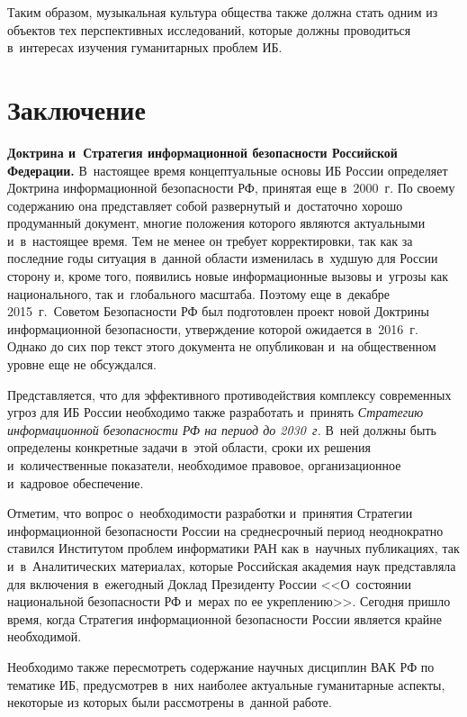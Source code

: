 \begin{multicols}{2}
     Таким образом, музыкальная культура общества также должна стать 
одним из объектов тех перспективных исследований, которые должны 
проводиться в~интересах изучения гуманитарных проблем ИБ.
    
    \section{Заключение}
     
     \textbf{Доктрина и~Стратегия информационной безопасности 
Российской Федерации.} В~настоящее время концептуальные основы 
ИБ России определяет Доктрина 
информационной без\-опас\-ности РФ, принятая еще в~2000~г. По своему 
содержанию она представляет собой развернутый и~достаточно хорошо 
продуманный документ, многие положения которого являются актуальными 
и~в~настоящее время. Тем не менее он требует корректировки, так как за 
последние годы ситуация в~данной области изменилась в~худшую для России 
сторону и, кроме того, появились новые информационные вызовы и~угрозы 
как национального, так и~глобального масштаба. 
     Поэтому еще в~декабре 2015~г.\ Советом Безопасности РФ был 
подготовлен проект новой Доктрины информационной безопасности, 
утверждение которой ожидается в~2016~г. Однако до сих пор текст этого 
документа не опубликован и~на общественном уровне еще не обсуждался.
     
     Представляется, что для эффективного противодействия комплексу 
современных угроз для ИБ России необходимо 
также разработать и~принять \textit{Стратегию информационной 
безопасности РФ на период до 2030~г.} В~ней должны быть определены 
конкретные задачи в~этой области, сроки их решения и~количественные 
показатели, необходимое правовое, организационное и~кадровое 
обеспе\-чение. 
     
     Отметим, что вопрос о~необходимости разработки и~принятия 
Стратегии информационной безопас\-ности России на среднесрочный период 
неоднократно ставился Институтом проблем информатики РАН как 
в~научных публикациях, так и~в~Аналитических материалах, которые 
Российская академия наук представляла для включения в~ежегодный Доклад 
Президенту России <<О~состоянии национальной безопасности РФ и~мерах 
по ее укреплению>>. Сегодня пришло время, когда Стратегия 
информационной безопасности России является крайне необходимой.
     
     Необходимо также пересмотреть содержание научных дисциплин ВАК 
РФ по тематике ИБ, предусмотрев в~них 
наиболее актуальные гуманитарные аспекты, некоторые из которых были 
рассмотрены в~данной работе.


\end{multicols}
